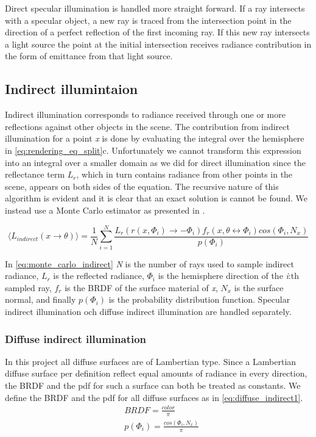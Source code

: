 \documentclass[a4paper, 12pt]{report}
\begin{document}
Direct specular illumination is handled more straight forward.
If a ray intersects with a specular object, a new ray is traced from the intersection point in the direction of a perfect reflection of the first incoming ray.
If this new ray intersects a light source the point at the initial intersection receives radiance contribution in the form of emittance from that light source.

\subsection{Indirect illumintaion}
Indirect illumination corresponds to radiance received through one or more reflections against other objects in the scene.
The contribution from indirect illumination for a point \emph{x} is done by evaluating the integral over the hemisphere in \autoref{eq:rendering_eq_split}c. 
Unfortunately we cannot transform this expression into an integral over a smaller domain as we did for direct illumination since the reflectance term $L_r$, which in turn contains radiance from other points in the scene, appears on both sides of the equation.
The recursive nature of this algorithm is evident and it is clear that an exact solution is cannot be found.
We instead use a Monte Carlo estimator as presented in \cite{dutre}.

\begin{equation}
\label{eq:monte_carlo_indirect}
\langle L_{indirect}(x \rightarrow \theta) \rangle = \frac{1}{N} \sum^{N}_{i=1} \frac{L_r(r(x,\Phi_i) \rightarrow -\Phi_i) f_r(x, \theta \leftrightarrow \Phi_i)cos(\Phi_i, N_x)}{p(\Phi_i)}
\end{equation}

In \autoref{eq:monte_carlo_indirect} \emph{N} is the number of rays used to sample indirect radiance, $L_r$ is the reflected radiance, $\Phi_i$ is the hemisphere direction of the \emph{i}:th sampled ray, $f_r$ is the BRDF of the surface material of \emph{x}, $N_x$ is the surface normal, and finally $p(\Phi_i)$ is the probability distribution function.
Specular indirect illumination och diffuse indirect illumination are handled separately.

\subsubsection{Diffuse indirect illumination}
In this project all diffuse surfaces are of Lambertian type.
Since a Lambertian diffuse surface per definition reflect equal amounts of radiance in every direction, the BRDF and the pdf for such a surface can both be treated as constants.
We define the BRDF and the pdf for all diffuse surfaces as  in \autoref{eq:diffuse_indirect1}.
\begin{subequations} \label{eq:diffuse_indirect1}
\begin{align} 
&BRDF = \frac{color}{\pi} \\
&p(\Phi_i) = \frac{cos(\Phi_i, N_x)}{\pi}
\end{align}
\end{subequations}
\end{document}
